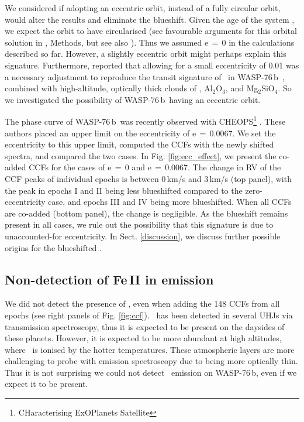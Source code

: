 \documentclass{aa}
\newcommand{\feI}{\ion{Fe}{i}}
\newcommand{\feII}{\ion{Fe}{ii}}
\newcommand{\planet}{WASP-76\,b}
\begin{document}
We considered if adopting an eccentric orbit, instead of a fully circular orbit, would alter the results and eliminate the blueshift. Given the age of the system \citep[1.8\,Gyr,][]{ehrenreich2020}, we expect the orbit to have circularised (see favourable arguments for this orbital solution in \citeauthor{ehrenreich2020} \citeyear{ehrenreich2020}, Methods, but see also \citeauthor{valentecorreia2022} \citeyear{valentecorreia2022}). Thus we assumed e$\,=\,$0 in the calculations described so far. However, a slightly eccentric orbit might perhaps explain this signature. Furthermore, \citet{savel2022} reported that allowing for a small eccentricity of 0.01 was a necessary adjustment to reproduce the transit signature of \feI\ in \planet\ \citep{ehrenreich2020}, combined with high-altitude, optically thick clouds of \feI, Al$_2$O$_3$, and Mg$_2$SiO$_4$. So we investigated the possibility of \planet\ having an eccentric orbit.

The phase curve of \planet\ was recently observed with CHEOPS\footnote{CHaracterising ExOPlanets Satellite} \citep{demangeon2024}. These authors placed an upper limit on the eccentricity of e$\,=\,$0.0067. We set the eccentricity to this upper limit, computed the CCFs with the newly shifted spectra, and compared the two cases. In Fig. \ref{fig:ecc_effect}, we present the co-added CCFs for the cases of e$\,=\,$0 and e$\,=\,$0.0067. The change in RV of the CCF peaks of individual epochs is between 0\,km/s and 3\,km/s (top panel), with the peak in epochs I and II being less blueshifted compared to the zero-eccentricity case, and epochs III and IV being more blueshifted. When all CCFs are co-added (bottom panel), the change is negligible. As the blueshift remains present in all cases, we rule out the possibility that this signature is due to unaccounted-for eccentricity. In Sect. \ref{discussion}, we discuss further possible origins for the blueshifted \feI.



\subsection{Non-detection of Fe\,II in emission}

We did not detect the presence of \feII, even when adding the 148 CCFs from all epochs (see right panels of Fig. \ref{fig:ccf}). \feII\ has been detected in several UHJs via transmission spectroscopy, thus it is expected to be present on the daysides of these planets. However, it is expected to be more abundant at high altitudes, where \feI\ is ionised by the hotter temperatures. These atmospheric layers are more challenging to probe with emission spectroscopy due to being more optically thin. Thus it is not surprising we could not detect \feII\ emission on \planet, even if we expect it to be present.
\end{document}
